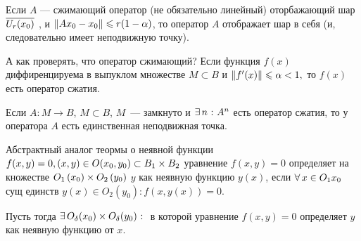  Если $A$ --- сжимающий оператор (не обязательно линейный) оторбажающий шар $\overline{U_r(x_0)}$ , и $\left\|{Ax_0 - x_0}\right\| \leqslant r(1-\alpha)$, то оператор $A$ отображает шар в себя (и, следовательно имеет неподвижную точку).


А как проверять, что оператор сжимающий?
 Если функция $f(x)$ диффиренцируема в выпуклом множестве $M\subset B$ и $\left\|{f'(x)}\right\| \leqslant\alpha < 1,$ то $f(x)$ есть оператор сжатия.



 Если $A\colon M\to B$, $M\subset B$, $M$~--- замкнуто и $\exists\,n\:\colon A^n$ есть оператор сжатия, то у оператора $A$ есть единственная неподвижная точка.

Абстрактный аналог теормы о неявной функции
$f(x, y) = 0, (x,y) \in O\!\left(x_0,y_0\right) \subset B_1\times B_2$
 уравнение $f(x,y) = 0$ определяет на кножестве $O_1\left(x_0\right)\times O_2\left(y_0\right)$ $y$ как неявную функцию $y(x)$, если $\forall\,x\in O_1{x_0}\:$ сущ единств $y(x)\in O_2(y_0)\colon f(x,y(x)) = 0$.

 Пусть 
тогда $\exists\,O_\delta(x_0)\times O_\delta(y_0)\:\colon $ в которой уравнение $f(x,y) = 0$ определяет $y$ как неявную функцию от $x$.

